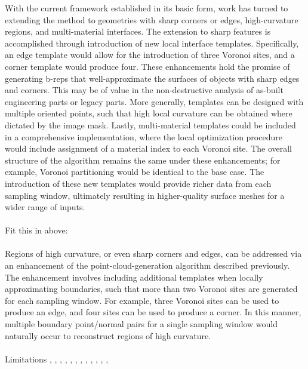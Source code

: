 With the current framework established in its basic form, work has turned to extending the method to geometries with sharp corners or edges, high-curvature regions, and multi-material interfaces. The extension to sharp features is accomplished through introduction of new local interface templates. Specifically, an edge template would allow for the introduction of three Voronoi sites, and a corner template would produce four. These enhancements hold the promise of generating b-reps that well-approximate the surfaces of objects with sharp edges and corners. This may be of value in the non-destructive analysis of as-built engineering parts or legacy parts. More generally, templates can be designed with multiple oriented points, such that high local curvature can be obtained where dictated by the image mask.  Lastly, multi-material templates could be included in a comprehensive implementation, where the local optimization procedure would include assignment of a material index to each Voronoi site. The overall structure of the algorithm remains the same under these enhancements; for example, Voronoi partitioning would be identical to the base case. The introduction of these new templates would provide richer data from each sampling window, ultimately resulting in higher-quality surface meshes for a wider range of inputs. \\ \\
%
\color{purple} Fit this in above: \\ \\
%
Regions of high curvature, or even sharp corners and edges, can be addressed via an enhancement of the point-cloud-generation algorithm described previously. The enhancement involves including additional templates when locally approximating boundaries, such that more than two Voronoi sites are generated for each sampling window. For example, three Voronoi sites can be used to produce an edge, and four sites can be used to produce a corner. In this manner, multiple boundary point/normal pairs for a single sampling window would naturally occur to reconstruct regions of high curvature. \\ \\
%
\color{purple} Limitations
\cite{edelsbrunner1994}, \cite{coeurjolly2021}, \cite{fleishman2005}, \cite{brochu2010}, \cite{berge2019}, \cite{dey2003}, \cite{amenta2000}, \cite{dey2011}, \cite{boltcheva2017}, \cite{boltcheva2009}, \cite{kazhdan_2008}, \cite{kazhdan_2013}, \cite{levin2004}

\color{black}